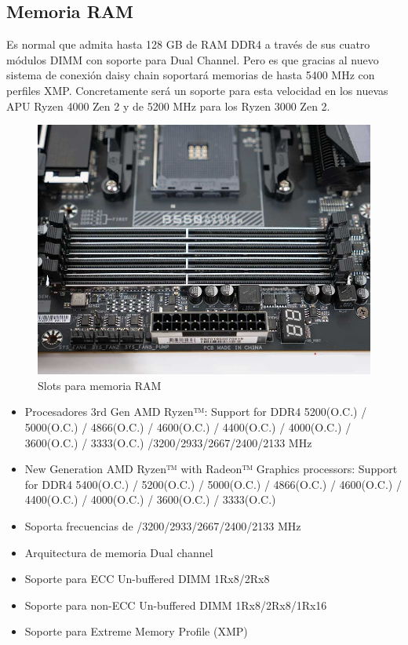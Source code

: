 \documentclass{article}
\begin{document}
  \newpage
    \subsection{Memoria RAM}
      Es normal que admita hasta 128 GB de RAM DDR4 a través de sus cuatro módulos DIMM con soporte para Dual Channel. Pero es que gracias al nuevo sistema de conexión daisy chain soportará memorias de hasta 5400 MHz con perfiles XMP. 
      Concretamente será un soporte para esta velocidad en los nuevas APU Ryzen 4000 Zen 2 y de 5200 MHz para los Ryzen 3000 Zen 2.
      \begin{figure}[h]
        \centering
        \includegraphics[scale = 0.5]{img/slots.jpg}
        \caption{Slots para memoria RAM}
      \end{figure}     
      \begin{itemize}
        \item Procesadores 3rd Gen AMD Ryzen™: Support for DDR4 5200(O.C.) / 5000(O.C.) / 4866(O.C.) / 4600(O.C.) / 4400(O.C.) / 4000(O.C.) / 3600(O.C.) / 3333(O.C.) /3200/2933/2667/2400/2133 MHz 
        \item New Generation AMD Ryzen™ with Radeon™ Graphics processors: Support for DDR4 5400(O.C.) / 5200(O.C.) / 5000(O.C.) / 4866(O.C.) / 4600(O.C.) / 4400(O.C.) / 4000(O.C.) / 3600(O.C.) / 3333(O.C.)
        \item Soporta frecuencias de /3200/2933/2667/2400/2133 MHz 
        \item Arquitectura de memoria Dual channel 
        \item Soporte para ECC Un-buffered DIMM 1Rx8/2Rx8 
        \item Soporte para non-ECC Un-buffered DIMM 1Rx8/2Rx8/1Rx16 
        \item Soporte para Extreme Memory Profile (XMP)
      \end{itemize}
  \newpage
\end{document}
